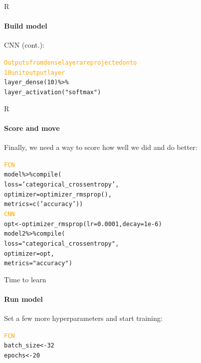 \documentclass{beamer}
\begin{document}
\begin{darkframes}
        \begin{frame}{R}
      \framesubtitle{Build model}
      \begin{block}
      {\small{CNN (cont.):}}{\vspace*{-.4cm}}
        \small{\begin{alltt}
              \textcolor{orange}{Outputs from dense layer are projected onto} \\
              \textcolor{orange}{10 unit output layer} \\
              layer\_dense(10) \%>\% \\
              layer\_activation("softmax")
        \end{alltt}}
      \end{block}
    \end{frame}
    
    \begin{frame}{R}
      \framesubtitle{Score and move}{\vspace*{-.5cm}}
      \begin{block}
      {\small{Finally, we need a way to score how well we did and do better:}}{\vspace*{-.4cm}}
      \small{\begin{alltt}
      \textcolor{orange}{FCN} \\
            model \%>\% compile( \\
                loss = 'categorical\_crossentropy', \\
                optimizer = optimizer\_rmsprop(), \\
                metrics = c('accuracy')) \\
            \textcolor{orange}{CNN} \\
            opt <- optimizer\_rmsprop(lr = 0.0001, decay = 1e-6) \\
            model2 \%>\% compile( \\
              loss = "categorical\_crossentropy", \\
              optimizer = opt, \\
              metrics = "accuracy")
        \end{alltt}}
      \end{block}
    \end{frame}
    
 \begin{frame}{Time to learn}
      \framesubtitle{Run model}{\vspace*{-.5cm}}
      \begin{block}
      {\small{Set a few more hyperparameters and start training:}}{\vspace*{-.4cm}}
      \small{\begin{alltt}
      \textcolor{orange}{FCN} \\
        batch\_size <- 32 \\
        epochs <- 20 \\
        

\end{alltt}}
\end{block}
\end{frame}
\end{darkframes}
\end{document}
